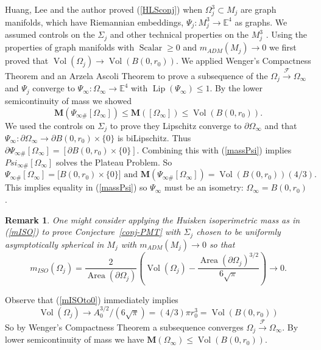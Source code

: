 \documentclass[12pt]{amsart}
\newtheorem{rmrk}[thm]{Remark}
\begin{document}
Huang, Lee and the author proved 
 (\ref{HLSconj}) when $\Omega_j^3\subset M_j$ are
graph manifolds, which have Riemannian embeddings, $\Psi_j: M^3_j \to 
{\mathbb{E}}^4$ as graphs.  We assumed controls on the $\Sigma_j$ and other technical properties on the 
$M_j^3$ \cite{HLS}.  Using the properties of
graph manifolds with ${\operatorname{Scalar}} \ge 0$ and $m_{ADM}(M_j) \to 0$
we first proved that  ${\operatorname{Vol}}(\Omega_j) \to {\operatorname{Vol}}(B(0,r_0))$.
We applied Wenger's Compactness 
Theorem and an Arzela Ascoli Theorem
to prove a subsequence of the $\Omega_j {\stackrel {\mathcal{F}}{\longrightarrow} } \Omega_\infty$
and $\Psi_j$ converge to $\Psi_\infty: \Omega_\infty\to \mathbb{E}^4$
with ${\operatorname{Lip}}(\Psi_\infty)\le 1$.
By the lower semicontinuity of mass we showed
\begin{equation}\label{massPsi}
{{\mathbf M}}(\Psi_{\infty\#} [\Omega_\infty])
\le {{\mathbf M}}( [\Omega_\infty])\le {\operatorname{Vol}}(B(0,r_0)).
\end{equation}
We used the controls on $\Sigma_j$ to prove they Lipschitz converge to
$\partial \Omega_\infty$ and that $\Psi_\infty: \partial \Omega_\infty \to 
\partial B(0, r_0)\times\{0\}$ is biLipschitz.   Thus
 $
 \partial \Psi_{\infty\#} [\Omega_\infty]=[\partial B(0,r_0) \times  \{0\}].
 $
Combining this with (\ref{massPsi}) implies $Psi_{\infty\#} [\Omega_\infty]$
solves the Plateau Problem.  So
\begin{equation}
\Psi_{\infty\#} [\Omega_\infty]=\lbrack B(0, r_0) \times  \{0\}\rbrack
\textrm{ and }
{{\mathbf M}}(\Psi_{\infty\#} [\Omega_\infty])={\operatorname{Vol}}(B(0,r_0)) (4/3).
\end{equation}
This implies equality in (\ref{massPsi}) so 
$\Psi_\infty$ must be an isometry: $\Omega_\infty=B(0, r_0)$ \cite{HLS}.

\begin{rmrk}
One might consider applying the Huisken isoperimetric
mass as in (\ref{mISO}) to prove Conjecture~\ref{conj-PMT} with
$\Sigma_j$ chosen to be uniformly asymptotically spherical in $M_j$ with $m_{ADM}(M_j) \to 0$ so that 
\begin{equation} \label{mISOto0}
m_{ISO}(\Omega_j)=\frac{2}{{\operatorname{Area}}(\partial \Omega_j)}
\left({\operatorname{Vol}}(\Omega_j)-\frac{{\operatorname{Area}}(\partial \Omega_j)^{3/2}}{6 \sqrt{\pi}}\right) \to 0.
\end{equation}
\end{rmrk}

Observe that (\ref{mISOto0}) immediately implies
\begin{equation}
{\operatorname{Vol}}(\Omega_j)\to{A_0^{3/2}}/{(6 \sqrt{\pi})}= (4/3) \pi r_0^3={\operatorname{Vol}}(B(0,r_0))
\end{equation}
So by Wenger's Compactness Theorem a subsequence converges
$\Omega_{j}{\stackrel {\mathcal{F}}{\longrightarrow} } \Omega_\infty$.  By lower semicontinuity
of mass we have 
$
{{\mathbf M}}(\Omega_{\infty}) \le {\operatorname{Vol}}(B(0,r_0)).
$
\end{document}
